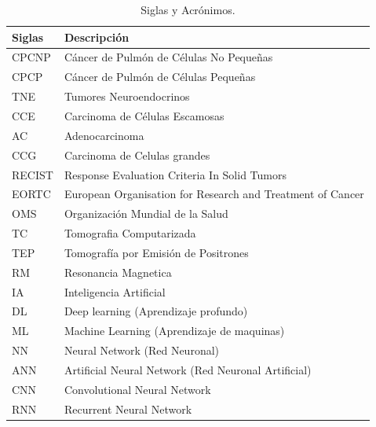 \documentclass[11pt,a4paper,openany]{article}
\begin{document}
\begin{table}[h]
    \centering
    \caption{Siglas y Acrónimos.}
     \vspace{0.3cm}
    \begin{tabular}{ p{3cm} p{12cm} }
        Siglas & Descripción \\ \hline 
        CPCNP & Cáncer de Pulmón de Células No Pequeñas \\ 
        CPCP & Cáncer de Pulmón de Células Pequeñas \\ 
        TNE & Tumores Neuroendocrinos\\
        CCE & Carcinoma de Células Escamosas\\
        AC & Adenocarcinoma\\
        CCG & Carcinoma de Celulas grandes\\
        RECIST & Response Evaluation Criteria In Solid Tumors \\ 
        EORTC & European Organisation for Research and Treatment of Cancer  \\ 
        OMS & Organización Mundial de la Salud  \\ 
        TC  & Tomografia Computarizada\\ 
        TEP  & Tomografía por Emisión de Positrones\\
        RM  & Resonancia Magnetica \\ 
        IA  & Inteligencia Artificial\\
        DL  & Deep learning (Aprendizaje profundo)\\
        ML  & Machine Learning (Aprendizaje de maquinas)\\
        NN  & Neural Network (Red Neuronal) \\
        ANN  & Artificial Neural Network (Red Neuronal Artificial) \\
        CNN  & Convolutional Neural Network \\ 
        RNN  & Recurrent Neural Network \\ 
    \end{tabular}
\end{table}

\newpage
{}
\end{document}

